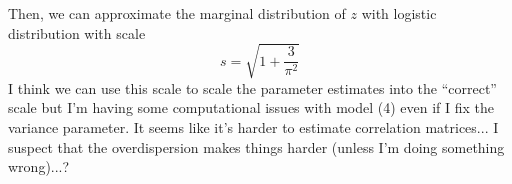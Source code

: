 \documentclass{article}\usepackage[]{graphicx}\usepackage[]{color}
\begin{document}
Then, we can approximate the marginal distribution of $z$ with logistic distribution with scale 
$$
s =  \sqrt{1 + \frac{3}{\pi^2}}
$$
I think we can use this scale to scale the parameter estimates into the ``correct'' scale but I'm having some computational issues with model (4) even if I fix the variance parameter. It seems like it's harder to estimate correlation matrices... I suspect that the overdispersion makes things harder (unless I'm doing something wrong)...?


\end{document}
